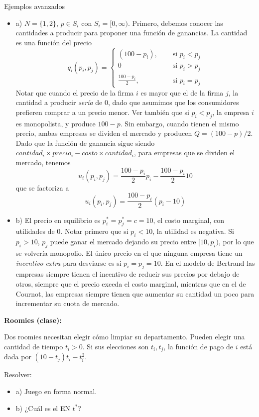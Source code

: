 \documentclass[12pt]{scrartcl}
\theoremstyle{definition}
\newenvironment{myitemize}
{ \begin{itemize}
		\setlength{\itemsep}{0pt}
		\setlength{\parskip}{0pt}
		\setlength{\parsep}{0pt}     }
	{ \end{itemize}                  }
\begin{document}
\begin{exbox}{Ejemplos avanzados}
    \begin{myitemize}
        \item[a)] $N=\{1, 2\}$, $p\in S_i$ con $S_i = [0, \infty)$. Primero, debemos conocer las cantidades a producir para proponer una función de ganancias. La cantidad es una función del precio
        \begin{equation}
        q_i(p_i, p_j)=\begin{cases}
            ( 100 - p_i ),\quad & \text{ si } p_i < p_j\\
            0 & \text{ si } p_i > p_j \\
            \frac{100 - p_i}{2}, & \text{ si } p_i = p_j
        \end{cases}
        \end{equation}
        Notar que cuando el precio de la firma $i$ es mayor que el de la firma $j$, la cantidad a producir \textit{sería} de 0, dado que asumimos que los consumidores prefieren comprar a un precio menor. Ver también que si $p_i < p_j$, la empresa $i$ es monopolista, y produce $100 - p$. Sin embargo, cuando tienen el mismo precio, ambas empresas se dividen el mercado y producen $Q = (100-p)/2$. Dado que la función de ganancia sigue siendo $cantidad_i \times precio_i - costo\times cantidad_i$, para empresas que se dividen el mercado, tenemos
        \[ u_i(p_i, p_j)=\frac{100-p_i}{2}p_i - \frac{100 - p_i}{2}10 \]
        que se factoriza a 
        \[ u_i(p_i, p_j)=\frac{100-p_i}{2}(p_i - 10) \]
        \item[b)] El precio en equilibrio es $p_i^* = p_j^* = c = 10$, el costo marginal, con utilidades de 0. Notar primero que si $p_i < 10$, la utilidad es negativa. Si $p_i > 10$, $p_j$ puede ganar el mercado dejando su precio entre $[10, p_i)$, por lo que se volvería monopolio. El único precio en el que ninguna empresa tiene un \textit{incentivo extra} para desviarse es si $p_i = p_j = 10$. En el modelo de Bertrand las empresas siempre tienen el incentivo de reducir sus precios por debajo de otros, siempre que el precio exceda el costo marginal, mientras que en el de Cournot, las empresas siempre tienen que aumentar su cantidad  un poco para incrementar su cuota de mercado.
            
    \end{myitemize}
    
    \textbf{Roomies (clase):}
    
    Dos roomies necesitan elegir cómo limpiar su departamento. Pueden elegir una cantidad de tiempo $t_i >0$. Si sus elecciones son $t_i, t_j$, la función de pago de $i$ está dada por $(10-t_j)t_i - t_i^2$. 
    
    Resolver:
    
    \begin{myitemize}
        \item[a)] Juego en forma normal.
        \item[b)] ¿Cuál es el EN $t^*$?
    \end{myitemize}

\end{exbox}
\end{document}
